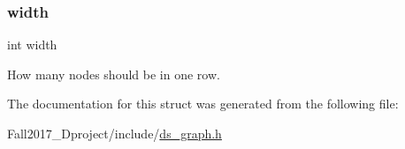 \subsubsection{\texorpdfstring{width}{width}}
{\footnotesize\ttfamily int width}



How many nodes should be in one row. 



The documentation for this struct was generated from the following file\+:\begin{DoxyCompactItemize}
\item 
Fall2017\+\_\+Dproject/include/\hyperlink{ds__graph_8h}{ds\+\_\+graph.\+h}\end{DoxyCompactItemize}
